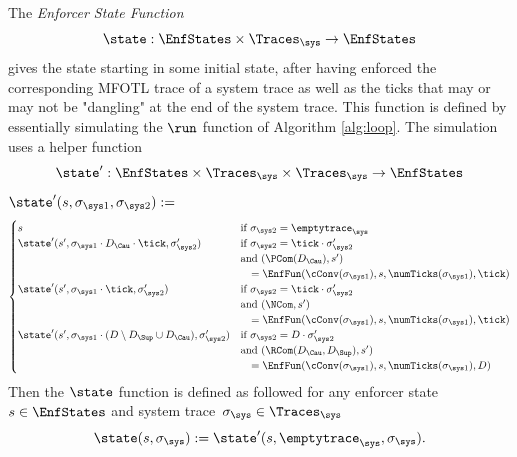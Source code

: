 \begin{definition}
    \label{def:enforcer-state-function}
    The \emph{Enforcer State Function}
    \begin{equation*}
        \state : \EnfStates \times \Traces_\sys \to \EnfStates
    \end{equation*}
    gives the state starting in some initial state, after having enforced
    the corresponding MFOTL trace of a system trace as well as the ticks
    that may or may not be "dangling" at the end of the system trace.
    This function is defined by essentially simulating the $\run$ function of
    Algorithm \ref{alg:loop}.
    The simulation uses a helper function
    \begin{equation*}
        \state' : \EnfStates \times \Traces_\sys \times \Traces_\sys \to \EnfStates
    \end{equation*}
    $\state'(s, \sigma_{\sys 1}, \sigma_{\sys 2}) := $
    \begin{align*}
        \begin{cases}
            s
                &\text{if } \sigma_{\sys 2} = \emptytrace_\sys \\
            \state'(s', \sigma_{\sys 1} \cdot D_\Cau \cdot \tick, \sigma_{\sys 2}')
                &\text{if } \sigma_{\sys 2} = \tick \cdot \sigma_{\sys 2}' \\
                &\text{and } (\PCom(D_\Cau), s') \\
                &\quad = \EnfFun(\cConv(\sigma_{\sys 1}), s, \numTicks(\sigma_{\sys 1}), \tick) \\
            \state'(s', \sigma_{\sys 1} \cdot \tick, \sigma_{\sys 2}')
                &\text{if } \sigma_{\sys 2} = \tick \cdot \sigma_{\sys 2}' \\
                &\text{and } (\NCom, s') \\
                &\quad = \EnfFun(\cConv(\sigma_{\sys 1}), s, \numTicks(\sigma_{\sys 1}), \tick) \\
            \state'(s', \sigma_{\sys 1} \cdot (D \setminus D_\Sup \cup D_\Cau), \sigma_{\sys 2}')
                &\text{if } \sigma_{\sys 2} = D \cdot \sigma_{\sys 2}' \\
                &\text{and } (\RCom(D_\Cau, D_\Sup), s') \\
                &\quad = \EnfFun(\cConv(\sigma_{\sys 1}), s, \numTicks(\sigma_{\sys 1}), D)
        \end{cases}
    \end{align*}
    Then the $\state$ function is defined as followed for any enforcer state
    $s \in \EnfStates$ and system trace~$\sigma_\sys \in \Traces_\sys$
    \begin{equation*}
        \state(s, \sigma_\sys) := \state'(s, \emptytrace_\sys, \sigma_\sys).
    \end{equation*}
\end{definition}

